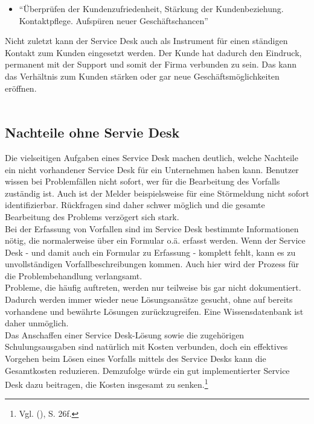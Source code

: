 \begin{itemize}
\item \enquote{Überprüfen der Kundenzufriedenheit, Stärkung der Kundenbeziehung.
Kontaktpflege. Aufspüren neuer Geschäftschancen}
\end{itemize}
\noindent
Nicht zuletzt kann der Service Desk auch als Instrument für einen ständigen Kontakt zum Kunden eingesetzt werden. Der Kunde hat dadurch den Eindruck, permanent mit der Support und somit der Firma verbunden zu sein. Das kann das Verhältnis zum Kunden stärken oder gar neue Geschäftsmöglichkeiten eröffnen.\\\\



\subsection{Nachteile ohne Servie Desk}
\noindent
Die vielseitigen Aufgaben eines Service Desk machen deutlich, welche Nachteile ein nicht vorhandener Service Desk für ein Unternehmen haben kann. Benutzer wissen bei Problemfällen nicht sofort, wer für die Bearbeitung des Vorfalls zuständig ist. Auch ist der Melder beispielsweise für eine Störmeldung nicht sofort identifizierbar. Rückfragen sind daher schwer möglich und die gesamte Bearbeitung des Problems verzögert sich stark.\\

\noindent 
Bei der Erfassung von Vorfallen sind im Service Desk bestimmte Informationen nötig, die normalerweise über ein Formular o.ä. erfasst werden. Wenn der Service Desk - und damit auch ein Formular zu Erfassung - komplett fehlt, kann es zu unvollständigen Vorfallbeschreibungen kommen. Auch hier wird der Prozess für die Problembehandlung verlangsamt.\\

\noindent
Probleme, die häufig auftreten, werden nur teilweise bis gar nicht dokumentiert. Dadurch werden immer wieder neue Lösungsansätze gesucht, ohne auf bereits vorhandene und bewährte Lösungen zurückzugreifen. Eine Wissensdatenbank ist daher unmöglich.\\

\noindent
Das Anschaffen einer Service Desk-Lösung sowie die zugehörigen Schulungsausgaben sind natürlich mit Kosten verbunden, doch ein effektives Vorgehen beim Lösen eines Vorfalls mittels des Service Desks kann die Gesamtkosten reduzieren. Demzufolge würde ein gut implementierter Service Desk dazu beitragen, die Kosten insgesamt zu senken.\footnote{Vgl. \citeauthor{Olbrich} (\citeyear{Olbrich}), S. 26f.}\\

